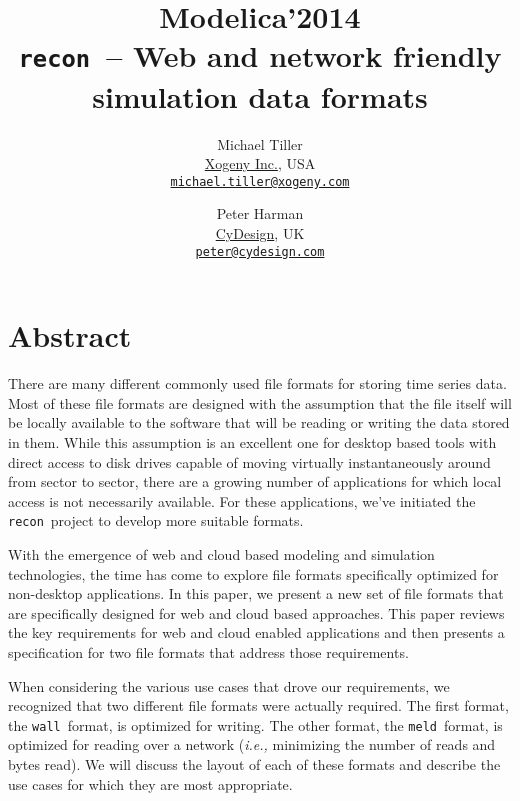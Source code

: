 \documentclass[11pt,a4paper,twocolumn]{article}
\newcommand{\recon}{\texttt{recon}}
\newcommand{\wall}{\texttt{wall}}
\newcommand{\meld}{\texttt{meld}}
\begin{document}
\title{\textbf{{\small Modelica'2014}\\
    \recon\  -- Web and network friendly simulation data formats}}

\author{Michael Tiller\\
  \href{http://xogeny.com}{Xogeny Inc.}, USA\\
  \href{mailto:michael.tiller@xogeny.com}
       {\nolinkurl{michael.tiller@xogeny.com}}
  \and Peter Harman\\
  \href{http://www.cydesign.com}
       {CyDesign}, UK\\
  \href{mailto:peter@cydesign.com}{\nolinkurl{peter@cydesign.com}}}
\date{} %
\maketitle\thispagestyle{empty} %

\section*{Abstract}

There are many different commonly used file formats for storing time
series data.  Most of these file formats are designed with the
assumption that the file itself will be locally available to the
software that will be reading or writing the data stored in them.
While this assumption is an excellent one for desktop based tools with
direct access to disk drives capable of moving virtually
instantaneously around from sector to sector, there are a growing
number of applications for which local access is not necessarily
available.  For these applications, we've initiated the
\recon\ project to develop more suitable formats.

With the emergence of web and cloud based modeling and simulation
technologies, the time has come to explore file formats specifically
optimized for non-desktop applications.  In this paper, we present a
new set of file formats that are specifically designed for web and
cloud based approaches.  This paper reviews the key requirements for
web and cloud enabled applications and then presents a specification
for two file formats that address those requirements.

When considering the various use cases that drove our requirements, we
recognized that two different file formats were actually required.
The first format, the \wall\ format, is optimized for writing.  The
other format, the \meld\ format, is optimized for reading over a
network (\textit{i.e.,} minimizing the number of reads and bytes
read).  We will discuss the layout of each of these formats and
describe the use cases for which they are most appropriate.
\end{document}

